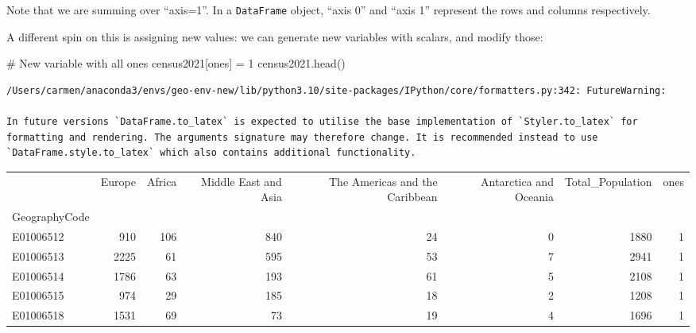 \documentclass[
  letterpaper,
  DIV=11,
  numbers=noendperiod]{scrreprt}
\newenvironment{Shaded}{\begin{snugshade}}{\end{snugshade}}
\newcommand{\CommentTok}[1]{\textcolor[rgb]{0.37,0.37,0.37}{#1}}
\newcommand{\DecValTok}[1]{\textcolor[rgb]{0.68,0.00,0.00}{#1}}
\newcommand{\NormalTok}[1]{\textcolor[rgb]{0.00,0.23,0.31}{#1}}
\newcommand{\OperatorTok}[1]{\textcolor[rgb]{0.37,0.37,0.37}{#1}}
\newcommand{\StringTok}[1]{\textcolor[rgb]{0.13,0.47,0.30}{#1}}
\begin{document}
Note that we are summing over ``axis=1''. In a \texttt{DataFrame}
object, ``axis 0'' and ``axis 1'' represent the rows and columns
respectively.

A different spin on this is assigning new values: we can generate new
variables with scalars, and modify those:

\begin{Shaded}
\begin{Highlighting}[]
\CommentTok{\# New variable with all ones}
\NormalTok{census2021[}\StringTok{\textquotesingle{}ones\textquotesingle{}}\NormalTok{] }\OperatorTok{=} \DecValTok{1}
\NormalTok{census2021.head()}
\end{Highlighting}
\end{Shaded}

\begin{verbatim}
/Users/carmen/anaconda3/envs/geo-env-new/lib/python3.10/site-packages/IPython/core/formatters.py:342: FutureWarning:

In future versions `DataFrame.to_latex` is expected to utilise the base implementation of `Styler.to_latex` for formatting and rendering. The arguments signature may therefore change. It is recommended instead to use `DataFrame.style.to_latex` which also contains additional functionality.
\end{verbatim}

\begin{tabular}{lrrrrrrr}
\toprule
{} &  Europe &  Africa &  Middle East and Asia &  The Americas and the Caribbean &  Antarctica and Oceania &  Total\_Population &  ones \\
GeographyCode &         &         &                       &                                 &                         &                   &       \\
\midrule
E01006512     &     910 &     106 &                   840 &                              24 &                       0 &              1880 &     1 \\
E01006513     &    2225 &      61 &                   595 &                              53 &                       7 &              2941 &     1 \\
E01006514     &    1786 &      63 &                   193 &                              61 &                       5 &              2108 &     1 \\
E01006515     &     974 &      29 &                   185 &                              18 &                       2 &              1208 &     1 \\
E01006518     &    1531 &      69 &                    73 &                              19 &                       4 &              1696 &     1 \\
\bottomrule
\end{tabular}
\end{document}
